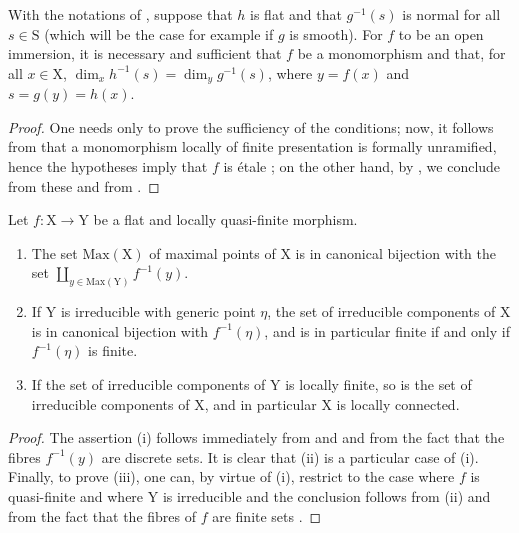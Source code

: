 \begin{corollary}[18.10.5]
\label{IV.18.10.5}
With the notations of , suppose that $h$ is flat and that $g^{-1}(s)$ is normal for all $s\in\mathrm{S}$ (which will be the case for example if $g$ is smooth).
For $f$ to be an open immersion, it is necessary and sufficient that $f$ be a monomorphism and that, for all $x\in\mathrm{X}$, $\dim_xh^{-1}(s)=\dim_yg^{-1}(s)$, where $y=f(x)$ and $s=g(y)=h(x)$.
\end{corollary}

\begin{proof}
One needs only to prove the sufficiency of the conditions; now, it follows from  that a monomorphism locally of finite presentation is formally unramified, hence the hypotheses imply that $f$ is \'etale ; on the other hand, by , we conclude from these and from .
\end{proof}

\begin{lemma}[18.10.6]
\label{IV.18.10.6}
Let $f:\mathrm{X}\to\mathrm{Y}$ be a flat and locally quasi-finite morphism.
\begin{enumerate}[label=(\roman*)]
  \item The set $\mathrm{Max}(\mathrm{X})$ of maximal points of $\mathrm{X}$ is in canonical bijection with the set $\coprod_{y\in\mathrm{Max}(\mathrm{Y})}f^{-1}(y)$.
  \item If $\mathrm{Y}$ is irreducible with generic point $\eta$, the set of irreducible components of $\mathrm{X}$ is in canonical bijection with $f^{-1}(\eta)$, and is in particular finite if and only if $f^{-1}(\eta)$ is finite.
  \item If the set of irreducible components of $\mathrm{Y}$ is locally finite, so is the set of irreducible components of $\mathrm{X}$, and in particular $\mathrm{X}$ is locally connected.
\end{enumerate}
\end{lemma}

\begin{proof}
The assertion (i) follows immediately from  and  and from the fact that the fibres $f^{-1}(y)$ are discrete sets.
It is clear that (ii) is a particular case of (i).
Finally, to prove (iii), one can, by virtue of (i), restrict to the case where $f$ is quasi-finite and where $\mathrm{Y}$ is irreducible  and the conclusion follows from (ii) and from the fact that the fibres of $f$ are finite sets .
\end{proof}

